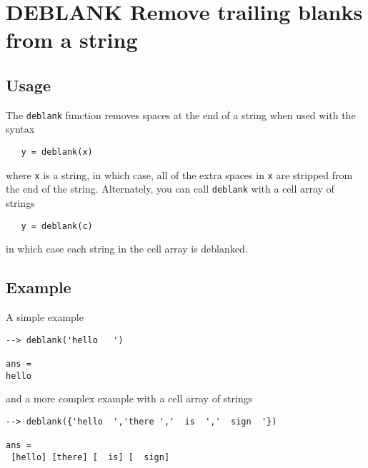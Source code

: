 \section{DEBLANK Remove trailing blanks from a string}

\subsection{Usage}

The \verb|deblank| function removes spaces at the end of a string
when used with the syntax
\begin{verbatim}
   y = deblank(x)
\end{verbatim}
where \verb|x| is a string, in which case, all of the extra spaces
in \verb|x| are stripped from the end of the string.  Alternately,
you can call \verb|deblank| with a cell array of strings
\begin{verbatim}
   y = deblank(c)
\end{verbatim}
in which case each string in the cell array is deblanked.
\subsection{Example}

A simple example
\begin{verbatim}
--> deblank('hello   ')

ans = 
hello
\end{verbatim}
and a more complex example with a cell array of strings
\begin{verbatim}
--> deblank({'hello  ','there ','  is  ','  sign  '})

ans = 
 [hello] [there] [  is] [  sign] 
\end{verbatim}
